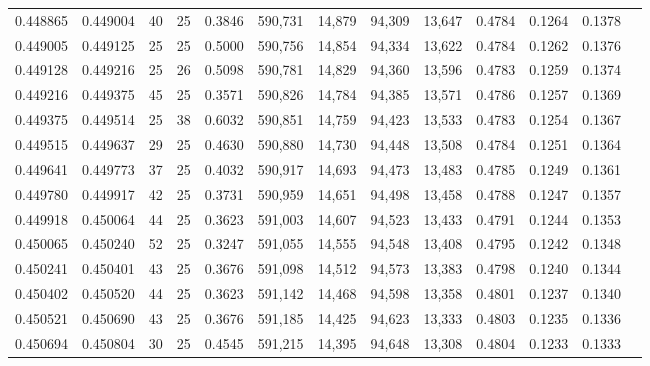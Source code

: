 \begin{tabular}{rrrrrrrrrrrrr}
0.448865 & 0.449004 &    40 &  25 &                                     0.3846 & 590,731 &  14,879 &  94,309 &  13,647 & 0.4784 & 0.1264 & 0.1378 \\
0.449005 & 0.449125 &    25 &  25 &                                     0.5000 & 590,756 &  14,854 &  94,334 &  13,622 & 0.4784 & 0.1262 & 0.1376 \\
0.449128 & 0.449216 &    25 &  26 &                                     0.5098 & 590,781 &  14,829 &  94,360 &  13,596 & 0.4783 & 0.1259 & 0.1374 \\
0.449216 & 0.449375 &    45 &  25 &                                     0.3571 & 590,826 &  14,784 &  94,385 &  13,571 & 0.4786 & 0.1257 & 0.1369 \\
0.449375 & 0.449514 &    25 &  38 &                                     0.6032 & 590,851 &  14,759 &  94,423 &  13,533 & 0.4783 & 0.1254 & 0.1367 \\
0.449515 & 0.449637 &    29 &  25 &                                     0.4630 & 590,880 &  14,730 &  94,448 &  13,508 & 0.4784 & 0.1251 & 0.1364 \\
0.449641 & 0.449773 &    37 &  25 &                                     0.4032 & 590,917 &  14,693 &  94,473 &  13,483 & 0.4785 & 0.1249 & 0.1361 \\
0.449780 & 0.449917 &    42 &  25 &                                     0.3731 & 590,959 &  14,651 &  94,498 &  13,458 & 0.4788 & 0.1247 & 0.1357 \\
0.449918 & 0.450064 &    44 &  25 &                                     0.3623 & 591,003 &  14,607 &  94,523 &  13,433 & 0.4791 & 0.1244 & 0.1353 \\
0.450065 & 0.450240 &    52 &  25 &                                     0.3247 & 591,055 &  14,555 &  94,548 &  13,408 & 0.4795 & 0.1242 & 0.1348 \\
0.450241 & 0.450401 &    43 &  25 &                                     0.3676 & 591,098 &  14,512 &  94,573 &  13,383 & 0.4798 & 0.1240 & 0.1344 \\
0.450402 & 0.450520 &    44 &  25 &                                     0.3623 & 591,142 &  14,468 &  94,598 &  13,358 & 0.4801 & 0.1237 & 0.1340 \\
0.450521 & 0.450690 &    43 &  25 &                                     0.3676 & 591,185 &  14,425 &  94,623 &  13,333 & 0.4803 & 0.1235 & 0.1336 \\
0.450694 & 0.450804 &    30 &  25 &                                     0.4545 & 591,215 &  14,395 &  94,648 &  13,308 & 0.4804 & 0.1233 & 0.1333 \\

\end{tabular}
